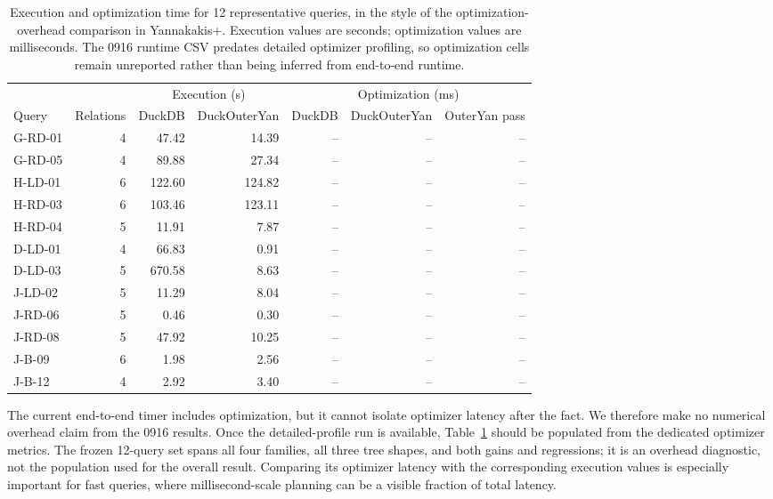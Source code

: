\begin{table}[t]
\centering
\small
\setlength{\tabcolsep}{5pt}
\caption{Execution and optimization time for 12 representative queries, in the
style of the optimization-overhead comparison in Yannakakis+. Execution values
are seconds; optimization values are milliseconds. The 0916 runtime CSV
predates detailed optimizer profiling, so optimization cells remain unreported
rather than being inferred from end-to-end runtime.}
\label{tab:optimization-time}
\begin{tabular}{lrrrrrr}
\toprule
& & \multicolumn{2}{c}{Execution (s)} &
\multicolumn{3}{c}{Optimization (ms)} \\
\cmidrule(lr){3-4}\cmidrule(lr){5-7}
Query & Relations & DuckDB & DuckOuterYan & DuckDB & DuckOuterYan & OuterYan pass \\
\midrule
G-RD-01 & 4 &  47.42 &  14.39 & -- & -- & -- \\
G-RD-05 & 4 &  89.88 &  27.34 & -- & -- & -- \\
H-LD-01 & 6 & 122.60 & 124.82 & -- & -- & -- \\
H-RD-03 & 6 & 103.46 & 123.11 & -- & -- & -- \\
H-RD-04 & 5 &  11.91 &   7.87 & -- & -- & -- \\
D-LD-01 & 4 &  66.83 &   0.91 & -- & -- & -- \\
D-LD-03 & 5 & 670.58 &   8.63 & -- & -- & -- \\
J-LD-02 & 5 &  11.29 &   8.04 & -- & -- & -- \\
J-RD-06 & 5 &   0.46 &   0.30 & -- & -- & -- \\
J-RD-08 & 5 &  47.92 &  10.25 & -- & -- & -- \\
J-B-09  & 6 &   1.98 &   2.56 & -- & -- & -- \\
J-B-12  & 4 &   2.92 &   3.40 & -- & -- & -- \\
\bottomrule
\end{tabular}
\end{table}

The current end-to-end timer includes optimization, but it cannot isolate
optimizer latency after the fact. We therefore make no numerical overhead
claim from the 0916 results. Once the detailed-profile run is available,
Table~\ref{tab:optimization-time} should be populated from the dedicated
optimizer metrics. The frozen 12-query set spans all four families, all three
tree shapes, and both gains and regressions; it is an overhead diagnostic, not
the population used for the overall result. Comparing its optimizer latency
with the corresponding execution values is especially important for fast
queries, where millisecond-scale planning can be a visible fraction of total
latency.
\fi
